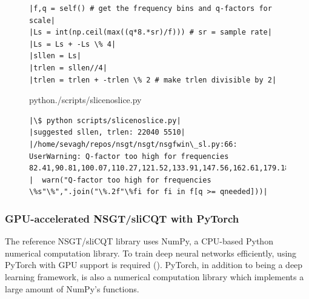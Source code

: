 \documentclass[report.tex]{subfiles}
\begin{document}
\begin{figure}[h]
  \centering
\begin{minipage}{\textwidth}
\begin{verbatim}
|f,q = self() # get the frequency bins and q-factors for scale|
|Ls = int(np.ceil(max((q*8.*sr)/f))) # sr = sample rate|
|Ls = Ls + -Ls \% 4|
|sllen = Ls|
|trlen = sllen//4|
|trlen = trlen + -trlen \% 2 # make trlen divisible by 2|
\end{verbatim}
\vspace{1em}
\end{minipage}
 \begin{minipage}{\textwidth}
  \centering
\setlength\partopsep{-\topsep}
\begin{inputminted}[linenos,breaklines,frame=single,fontsize=\scriptsize]{python}{./scripts/slicenoslice.py}
\end{inputminted}
 \vspace{1em}
 \end{minipage}
 \begin{minipage}{\textwidth}
  \centering
\begin{verbatim}
|\$ python scripts/slicenoslice.py|
|suggested sllen, trlen: 22040 5510|
|/home/sevagh/repos/nsgt/nsgt/nsgfwin\_sl.py:66: UserWarning: Q-factor too high for frequencies 82.41,90.81,100.07,110.27,121.52,133.91,147.56,162.61,179.18,...|
|  warn("Q-factor too high for frequencies \%s"\%",".join("\%.2f"\%fi for fi in f[q >= qneeded]))|
\end{verbatim}
 \end{minipage}
  \label{code:slicenoslice}
\end{figure}

\subsubsection{GPU-accelerated NSGT/sliCQT with PyTorch}
\label{sec:torchslicq}

The reference NSGT/sliCQT library uses NumPy, a CPU-based Python numerical computation library. To train deep neural networks efficiently, using PyTorch with GPU support is required (\cite{pytorch}). PyTorch, in addition to being a deep learning framework, is also a numerical computation library which implements a large amount of NumPy's functions.
\end{document}
